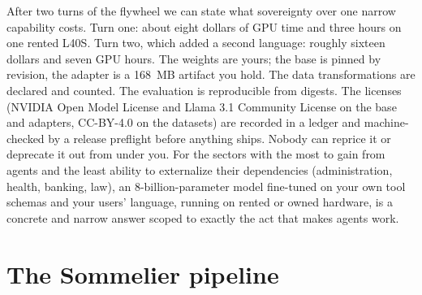 \documentclass{article}
\newcommand{\sommelier}{Sommelier}
\begin{document}
After two turns of the flywheel we can state what sovereignty over one narrow capability costs. Turn one: about eight dollars of GPU time and three hours on one rented L40S. Turn two, which added a second language: roughly sixteen dollars and seven GPU hours. The weights are yours; the base is pinned by revision, the adapter is a 168~MB artifact you hold. The data transformations are declared and counted. The evaluation is reproducible from digests. The licenses (NVIDIA Open Model License and Llama 3.1 Community License on the base and adapters, CC-BY-4.0 on the datasets) are recorded in a ledger and machine-checked by a release preflight before anything ships. Nobody can reprice it or deprecate it out from under you. For the sectors with the most to gain from agents and the least ability to externalize their dependencies (administration, health, banking, law), an 8-billion-parameter model fine-tuned on your own tool schemas and your users' language, running on rented or owned hardware, is a concrete and narrow answer scoped to exactly the act that makes agents work.

\section{The \sommelier{} pipeline}
\label{sec:pipeline}
\end{document}
